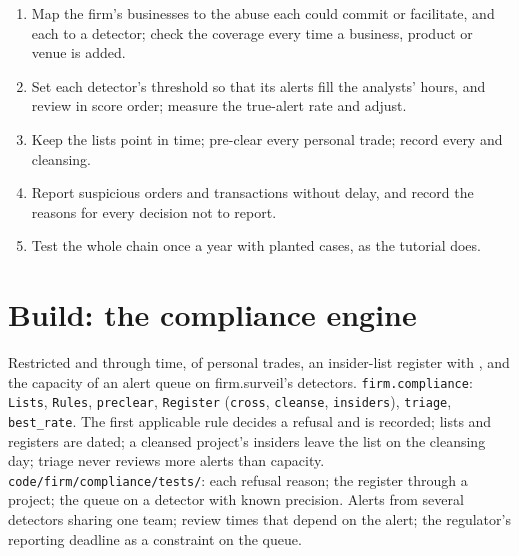 \begin{method}\label{met:fm:compliance-and-market-abuse:run}
\begin{enumerate}
\item Map the firm's businesses to the abuse each could commit or facilitate, and each to a detector; check the coverage every time a business,
product or venue is added.
\item Set each detector's threshold so that its alerts fill the analysts' hours, and review in score order; measure the true-alert rate and adjust.
\item Keep the lists point in time; pre-clear every personal trade; record every  and cleansing.
\item Report suspicious orders and transactions without delay, and record the reasons for every decision not to report.
\item Test the whole chain once a year with planted cases, as the tutorial does.
\end{enumerate}
\end{method}

\section{Build: the compliance engine}\label{bld:fm:compliance-and-market-abuse:compliance}

\begin{build}
 Restricted and  through time,  of personal trades, an insider-list register with , and the
capacity of an alert queue on firm.surveil's detectors.
 \texttt{firm.compliance}: \texttt{Lists}, \texttt{Rules}, \texttt{preclear}, \texttt{Register} (\texttt{cross},
\texttt{cleanse}, \texttt{insiders}), \texttt{triage}, \texttt{best\_rate}.
 The first applicable rule decides a refusal and is recorded; lists and registers are dated; a cleansed project's insiders leave the
list on the cleansing day; triage never reviews more alerts than capacity.
 \texttt{code/firm/compliance/tests/}: each refusal reason; the register through a project; the queue on a detector with
known precision.
 Alerts from several detectors sharing one team; review times that depend on the alert; the regulator's reporting deadline as a
constraint on the queue.
\end{build}

